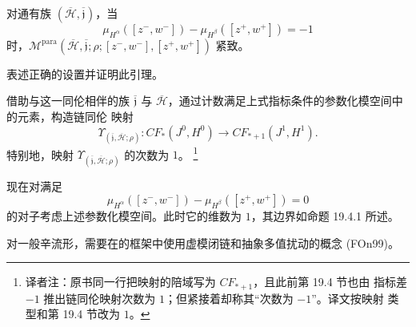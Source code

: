 \begin{lemma}
\label{lem:parameterized-index-minus-one-compactness}
对通有族 $(\overline{\mathcal H},\overline{\mathfrak j})$，当
\[
 \mu_{H^\alpha}([z^-,w^-])-\mu_{H^\beta}([z^+,w^+])=-1
\]
时，$\mathcal M^{\mathrm{para}}
(\overline{\mathcal H},\overline{\mathfrak j};\rho;
[z^-,w^-],[z^+,w^+])$ 紧致。
\end{lemma}

\begin{exercise}
\label{ex:fredholm-setup-parameterized-compactness}
表述正确的\personFredholm{}设置并证明此引理。
\end{exercise}

借助与这一同伦相伴的族 $\overline{\mathfrak j}$ 与
$\overline{\mathcal H}$，通过计数满足上式指标条件的参数化模空间中的元素，构造链同伦
映射
\[
 \Upsilon_{(\overline{\mathfrak j},\overline{\mathcal H};\rho)}:
 CF_*(J^0,H^0)\longrightarrow CF_{*+1}(J^1,H^1).
\]
特别地，映射 $\Upsilon_{(\overline{\mathfrak j},\overline{\mathcal H};\rho)}$ 的次数为
$1$。
\footnote{译者注：原书同一行把映射的陪域写为 $CF_{*+1}$，且此前第 19.4 节也由
指标差 $-1$ 推出链同伦映射次数为 $1$；但紧接着却称其“次数为 $-1$”。译文按映射
类型和第 19.4 节改为 $1$。}

现在对满足
\[
 \mu_{H^\alpha}([z^-,w^-])-\mu_{H^\beta}([z^+,w^+])=0
\]
的对子考虑上述参数化模空间。此时它的维数为 $1$，其边界如命题 19.4.1 所述。

\begin{remark}
\label{rem:general-case-virtual-moduli-cycle}
对一般辛流形，需要在\termKuranishiStructure{}的框架中使用虚模闭链和抽象多值扰动的概念
(FOn99)。
\end{remark}
